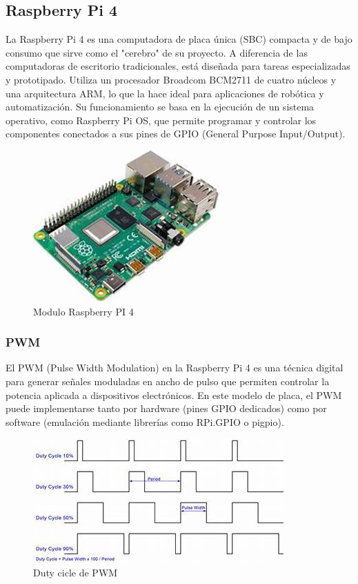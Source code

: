 \documentclass[12pt,a4paper]{article}
\begin{document}
\subsection{Raspberry Pi 4}
La Raspberry Pi 4 es una computadora de placa única (SBC) compacta y de bajo consumo que sirve como el "cerebro" de su proyecto. A diferencia de las computadoras de escritorio tradicionales, está diseñada para tareas especializadas y prototipado. Utiliza un procesador Broadcom BCM2711 de cuatro núcleos y una arquitectura ARM, lo que la hace ideal para aplicaciones de robótica y automatización. Su funcionamiento se basa en la ejecución de un sistema operativo, como Raspberry Pi OS, que permite programar y controlar los componentes conectados a sus pines de GPIO (General Purpose Input/Output).
\begin{figure}[H]
\centering
\includegraphics[width=0.5\linewidth]{Carpeta tecnica/Imagen2.png}
\caption{Modulo Raspberry PI 4}
\end{figure}

\subsubsection{PWM}

El PWM (Pulse Width Modulation) en la Raspberry Pi 4 es una técnica digital para generar señales moduladas en ancho de pulso que permiten controlar la potencia aplicada a dispositivos electrónicos.
En este modelo de placa, el PWM puede implementarse tanto por hardware (pines GPIO dedicados) como por software (emulación mediante librerías como RPi.GPIO o pigpio).

\begin{figure}[H]
\includegraphics[width=0.9\linewidth]{Carpeta tecnica/PWM.png}
\caption{Duty cicle de PWM}
\end{figure}
\end{document}
